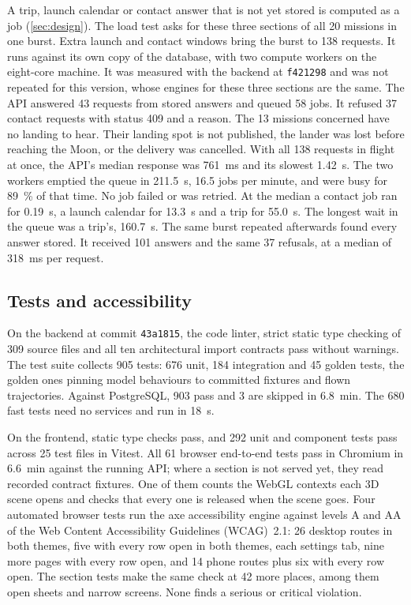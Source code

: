 \documentclass[11pt,a4paper]{article}
\newcommand{\pwcommit}{\texttt{43a1815}}
\begin{document}
A trip, launch calendar or contact answer that is not yet stored is computed as a job
(\cref{sec:design}). The load test asks for these three sections of all 20 missions in
one burst. Extra launch and contact windows bring the burst to 138 requests. It runs against
its own copy of the database, with two compute workers on the eight-core machine. It was
measured with the backend at \texttt{f421298} and was not repeated for this version, whose
engines for these three sections are the same. The API answered 43 requests from stored answers and queued
58 jobs. It refused 37 contact requests with status 409 and a reason. The 13 missions
concerned have no landing to hear. Their landing spot is not published, the lander was
lost before reaching the Moon, or the delivery was cancelled. With all 138 requests in flight at once, the API's median response was
\qty{761}{\ms} and its slowest \qty{1.42}{\s}. The two workers emptied the queue in
\qty{211.5}{\s}, 16.5 jobs per minute, and were busy for \qty{89}{\percent} of that time.
No job failed or was retried. At the median a contact job ran for \qty{0.19}{\s}, a
launch calendar for \qty{13.3}{\s} and a trip for \qty{55.0}{\s}. The longest wait in
the queue was a trip's, \qty{160.7}{\s}. The same burst repeated afterwards found every
answer stored. It received 101 answers and the same 37 refusals, at a median of
\qty{318}{\ms} per request.

\subsection{Tests and accessibility}

On the backend at commit \pwcommit, the code linter, strict static type checking of
309 source files and all ten architectural import contracts pass without warnings. The test
suite collects 905 tests: 676 unit, 184 integration and 45 golden tests, the golden ones
pinning model behaviours to committed fixtures and flown trajectories. Against PostgreSQL,
903 pass and 3 are skipped in \qty{6.8}{\minute}. The 680 fast tests need no services and
run in \qty{18}{\s}.

On the frontend, static type checks pass, and 292 unit and component tests pass across 25 test
files in Vitest. All 61 browser end-to-end tests pass in Chromium in \qty{6.6}{\minute} against
the running API; where a section is not served yet, they read recorded contract fixtures. One
of them counts the WebGL contexts each 3D scene opens and checks that every one is released
when the scene goes. Four automated browser tests run the axe accessibility engine against
levels A and AA of the Web Content Accessibility Guidelines (WCAG)~2.1: 26 desktop routes in
both themes, five with every row open in both themes, each settings tab, nine more pages with
every row open, and 14 phone routes plus six with every row open. The section tests make the same
check at 42 more places, among them open sheets and narrow screens. None finds a serious or critical
violation.
\end{document}
